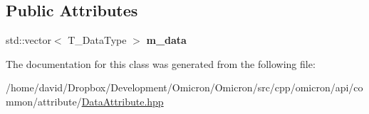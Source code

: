 \subsection*{Public Attributes}
\begin{DoxyCompactItemize}
\item 
std\+::vector$<$ T\+\_\+\+Data\+Type $>$ {\bfseries m\+\_\+data}\hypertarget{classomi_1_1_data_attribute_1_1_typed_data_storage_a610f335e3d043b1ad0a12dd441ae7b34}{}\label{classomi_1_1_data_attribute_1_1_typed_data_storage_a610f335e3d043b1ad0a12dd441ae7b34}

\end{DoxyCompactItemize}


The documentation for this class was generated from the following file\+:\begin{DoxyCompactItemize}
\item 
/home/david/\+Dropbox/\+Development/\+Omicron/\+Omicron/src/cpp/omicron/api/common/attribute/\hyperlink{_data_attribute_8hpp}{Data\+Attribute.\+hpp}\end{DoxyCompactItemize}
